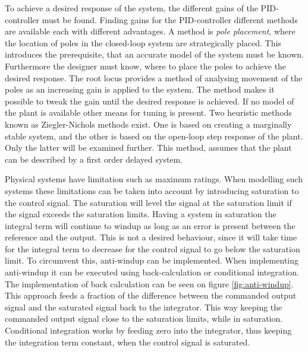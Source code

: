 \documentclass[../../main.tex]{subfiles}
\begin{document}
To achieve a desired response of the system, the different gains of the PID-controller must be found. Finding gains for the PID-controller different methods are available each with different advantages. A method is \textit{pole placement}, where the location of poles in the closed-loop system are strategically placed. This introduces the prerequisite, that an accurate model of the system must be known. Furthermore the designer must know, where to place the poles to achieve the desired response.
The root locus provides a method of analysing movement of the poles as an increasing gain is applied to the system. The method makes it possible to tweak the gain until the desired response is achieved.
If no model of the plant is available other means for tuning is present. Two heuristic methods known as Ziegler-Nichols methods exist. One is based on creating a marginally stable system, and the other is based on the open-loop step response of the plant. Only the latter will be examined further. This method, assumes that the plant can be described by a first order delayed system. 



Physical systems have limitation such as maximum ratings. When modelling such systems these limitations can be taken into account by introducing saturation to the control signal. The saturation will level the signal at the saturation limit if the signal exceeds the saturation limits. Having a system in saturation the integral term will continue to windup as long as an error is present between the reference and the output. This is not a desired behaviour, since it will take time for the integral term to decrease for the control signal to go below the saturation limit. To circumvent this, anti-windup can be implemented. %
When implementing anti-windup it can be executed using back-calculation or conditional integration. The implementation of back calculation can be seen on figure \ref{fig:anti-windup}. This approach feeds a fraction of the difference between the commanded output signal and the saturated signal back to the integrator. This way keeping the commanded output signal close to the saturation limits, while in saturation. Conditional integration works by feeding zero into the integrator, thus keeping the integration term constant, when the control signal is saturated. 
\end{document}
